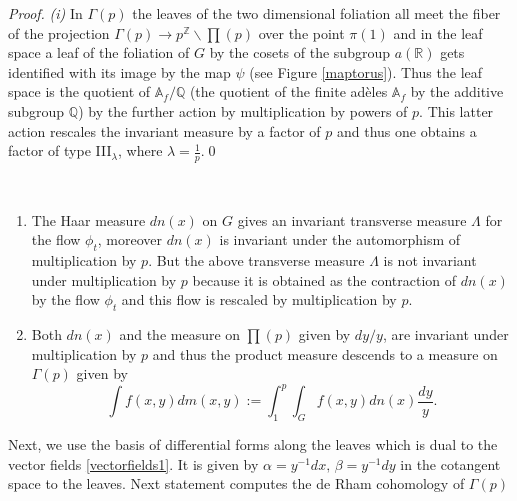 \documentclass[graybox, envcountsect%
]{svmult}
\def\A{{\mathbb A}}
\def\Q{{\mathbb Q}}
\def\R{{\mathbb R}}
\def\Z{{\mathbb Z}}
\def\no{\noindent}
\begin{document}
\begin{proof} {\it (i)}
\no In $\Gamma(p)$ the leaves of the two dimensional foliation all meet the fiber of the projection $\Gamma(p)\to p^\Z\backslash \prod(p)$ over the point $\pi(1)$ and in the leaf space a leaf of the foliation of $G$ by the cosets of the subgroup $a(\R)$ gets identified with its image by the map $\psi$ (see Figure \ref{maptorus}). Thus the leaf space is the quotient of $\A_f/\Q$ (the quotient of the finite ad\`eles $\A_f$ by the additive subgroup $\Q$) by the further action by multiplication by powers of $p$. This latter action rescales the invariant measure by a factor of $p$ and thus one obtains a factor of type  III$_\lambda$, where $\lambda=\frac 1p$.\qed\end{proof}
 
\begin{rem}\label{transverse}\
\begin{enumerate}
 \item The Haar measure $dn(x)$ on $G$ gives an invariant transverse measure $\Lambda$ for the flow $\phi_t$, moreover $dn(x)$ is invariant under the automorphism of multiplication by $p$. But the above transverse measure $\Lambda$ is not invariant under multiplication by $p$ because it is obtained as the contraction of $dn(x)$ by the flow $\phi_t$ and this flow is rescaled by multiplication by $p$.
\item Both $dn(x)$ and the measure on $\prod(p)$ given by $dy/y$, are invariant under multiplication by $p$ and thus the product measure descends to a measure on $\Gamma(p)$ given by 
	\begin{equation}\label{measurep}
\int f(x,y) dm(x,y):= \int_1^p\int_G f(x,y)dn(x)\frac{dy}{y}.
\end{equation}
\end{enumerate}
\end{rem}

\vspace{.1in}

 Next, we use the  basis of differential forms along the leaves which is dual to the vector fields \eqref{vectorfields1}. It is given by  $\alpha=y^{-1}dx,\,\beta= y^{-1}dy$ in the cotangent space to the leaves.\newline
 Next statement computes the de Rham cohomology of $\Gamma(p)$
\end{document}
